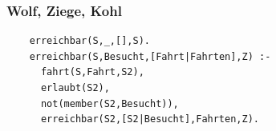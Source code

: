 \documentclass{beamer}
\begin{document}
\begin{frame}[fragile]
  \frametitle{Wolf, Ziege, Kohl}
  \begin{lstlisting}
    erreichbar(S,_,[],S).
    erreichbar(S,Besucht,[Fahrt|Fahrten],Z) :-
      fahrt(S,Fahrt,S2),
      erlaubt(S2),
      not(member(S2,Besucht)),
      erreichbar(S2,[S2|Besucht],Fahrten,Z).
  \end{lstlisting}
\end{frame}
\end{document}
